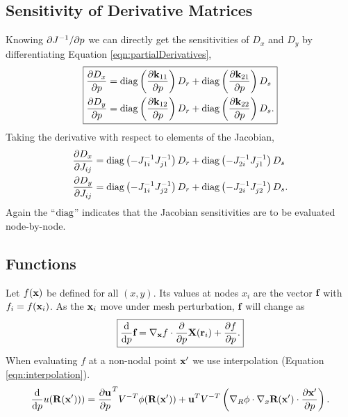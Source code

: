 \subsection{Sensitivity of Derivative Matrices}

Knowing $\partial{J^{-1}}/\partial{p}$ we can directly get the sensitivities of $D_x$ and $D_y$ by differentiating Equation \ref{eqn:partialDerivatives},
%
\begin{equation}
\boxed{
\begin{aligned}
\frac{\partial{D_x}}{\partial{p}} &= \operatorname{diag} \left( \frac{\partial{\textbf{k}_{11}}}{\partial{p}} \right) D_r + \operatorname{diag} \left( \frac{\partial{\textbf{k}_{21}}}{\partial{p}} \right) D_s \\
\frac{\partial{D_y}}{\partial{p}} &= \operatorname{diag} \left( \frac{\partial{\textbf{k}_{12}}}{\partial{p}} \right) D_r + \operatorname{diag} \left( \frac{\partial{\textbf{k}_{22}}}{\partial{p}} \right) D_s. \\
\end{aligned}
}
\label{eqn:partialDerivativeSensitivities}
\end{equation}
%
Taking the derivative with respect to elements of the Jacobian,
%
\begin{equation}
\begin{aligned}
\frac{\partial{D_x}}{\partial{J_{ij}}} &= \operatorname{diag} \left( -J^{-1}_{1i} J^{-1}_{j1} \right) D_r + \operatorname{diag} \left( -J^{-1}_{2i} J^{-1}_{j1} \right) D_s \\
\frac{\partial{D_y}}{\partial{J_{ij}}} &= \operatorname{diag} \left( -J^{-1}_{1i} J^{-1}_{j2} \right) D_r + \operatorname{diag} \left( -J^{-1}_{2i} J^{-1}_{j2} \right) D_s.
\end{aligned}
\end{equation}
%
Again the ``$\operatorname{diag}$'' indicates that the Jacobian sensitivities are to be evaluated node-by-node.

\subsection{Functions}

Let $f(\textbf{x})$ be defined for all $(x,y)$.  Its values at nodes $x_i$ are the vector $\textbf{f}$ with $f_i = f(\textbf{x}_i)$.  As the $\textbf{x}_i$ move under mesh perturbation, $\textbf{f}$ will change as
%
\begin{equation}
\boxed{
\frac{\mathrm{d}{}}{\mathrm{d}{p}} \textbf{f} = \nabla_{\textbf{x}} f \cdot \frac{\partial{}}{\partial{p}} \textbf{X}(\textbf{r}_i) + \frac{\partial{f}}{\partial{p}}.
}
\end{equation}
%
When evaluating $f$ at a non-nodal point $\textbf{x}'$ we use interpolation (Equation \ref{eqn:interpolation}).
%
\begin{equation}
\frac{\mathrm{d}{}}{\mathrm{d}{p}} u(\textbf{R}(\textbf{x}'))) = \frac{\partial{\textbf{u}}}{\partial{p}}^T V^{-T} \phi(\textbf{R}(\textbf{x}')) + \textbf{u}^T V^{-T} \left( \nabla_R \phi \cdot \nabla_x \textbf{R}(\textbf{x}') \cdot \frac{\partial{\textbf{x}'}}{\partial{p}} \right).
\end{equation}

